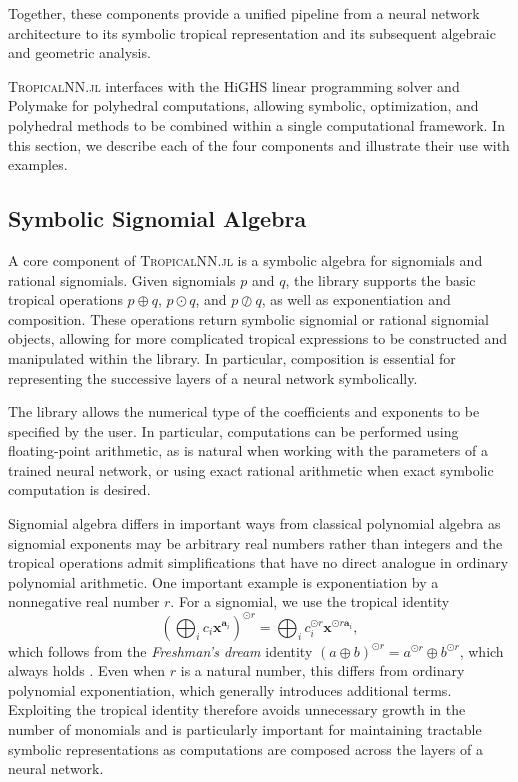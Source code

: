 \documentclass[10pt]{article}
\theoremstyle{definition}
\theoremstyle{remark}
\renewcommand{\vec}[1]{\mathbf{#1}}
\def\va{{\vec{a}}}
\def\vx{{\vec{x}}}
\begin{document}
Together, these components provide a unified pipeline from a neural network architecture to its symbolic tropical representation and its subsequent algebraic and geometric analysis.

\textsc{TropicalNN.jl} interfaces with the HiGHS linear programming solver \citep{huangfu2018parallelizing} and Polymake \citep{gawrilow2000polymake} for polyhedral computations, allowing
symbolic, optimization, and polyhedral methods to be combined within a single computational framework. In this section, we describe each of the four components and illustrate their use with examples.

\subsection{Symbolic Signomial Algebra}

A core component of \textsc{TropicalNN.jl} is a symbolic algebra for signomials and rational signomials. Given signomials $p$ and $q$, the library supports the basic tropical operations $p\oplus q$, $p\odot q$, and $p\oslash q$, as well as exponentiation and
composition. These operations return symbolic signomial or rational
signomial objects, allowing for more complicated tropical expressions to be constructed and manipulated within the library. In
particular, composition is essential for representing the successive
layers of a neural network symbolically.

The library allows the numerical type of the coefficients and exponents to be specified by the user. In particular, computations can be performed using floating-point arithmetic, as is natural when working with the parameters of a trained neural network, or using exact rational arithmetic when exact symbolic computation is desired.

Signomial algebra differs in important ways from classical polynomial
algebra as signomial exponents may be arbitrary real
numbers rather than integers and the tropical operations admit
simplifications that have no direct analogue in ordinary polynomial
arithmetic. One important example is exponentiation by a nonnegative
real number $r$. For a signomial, we use the tropical identity
$$
    \left(\bigoplus_i c_i \vx^{\va_i} \right)^{\odot r} = \bigoplus_i c_i ^{\odot r} \vx^{\odot r \va_i},
$$
which follows from the \emph{Freshman's dream} identity $(a \oplus b)^{\odot r} = a ^{\odot r} \oplus b ^{\odot r}$, which always holds \citep[e.g.,][]{maclagan2015introduction}. Even when $r$ is a natural
number, this differs from ordinary polynomial exponentiation, which
generally introduces additional terms. Exploiting the tropical identity therefore avoids unnecessary growth in the number of monomials and is particularly important for maintaining tractable symbolic representations as computations are composed across the layers of a neural network.
\end{document}
